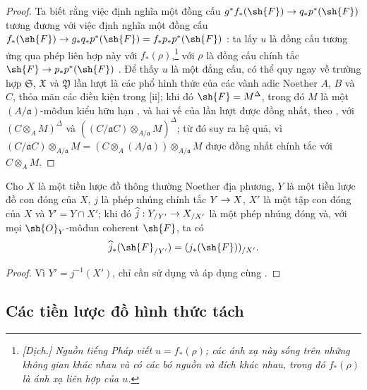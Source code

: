 \documentclass[oneside]{amsart}
\makeatletter
\newcommand{\ega@arrow}[2]{\mathchoice{#1}{#2}{#2}{#2}}
\renewcommand{\to}{\ega@arrow{\longrightarrow}{\rightarrow}}
\newcommand{\oldpage}[2][]{{\marginnote{\normalfont\textbf{#1}~|~#2}}\ignorespaces}
\let\EGAOriginalLabel\label
\renewcommand{\label}[1]{\phantomsection\EGAOriginalLabel{#1}}
\makeatother
\begin{document}
\begin{proof}
Ta biết rằng việc định nghĩa một đồng cấu $g^*f_*(\sh{F}) \to q_*p^*(\sh{F})$ tương đương với việc định nghĩa một đồng cấu $f_*(\sh{F}) \to g_*q_*p^*(\sh{F}) = f_*p_*p^*(\sh{F})$ :
ta lấy $u$ là đồng cấu tương ứng qua phép liên hợp này với $f_*(\rho)$,\footnote{\emph{[Dịch.] Nguồn tiếng Pháp viết $u=f_*(\rho)$; các ánh xạ này sống trên những không gian khác nhau và có các bó nguồn và đích khác nhau, trong đó $f_*(\rho)$ là ánh xạ liên hợp của $u$.}} với $\rho$ là đồng cấu chính tắc $\sh{F}\to p_*p^*(\sh{F})$ .
Để thấy $u$ là một đẳng cấu, có thể quy ngay về trường hợp $\mathfrak{S}$, $\mathfrak{X}$ và $\mathfrak{Y}$ lần lượt là các phổ hình thức của các vành adic Noether $A$, $B$ và $C$, thỏa mãn các điều kiện trong [ii];
khi đó $\sh{F}=M^\Delta$, trong đó $M$ là một $(A/\mathfrak{a})$-môđun kiểu hữu hạn , và hai vế của  lần lượt được đồng nhất, theo , với $(C\otimes_A M)^\Delta$ và $((C/\mathfrak{a}C)\otimes_{A/\mathfrak{a}}M)^\Delta$; từ đó suy ra hệ quả, vì $(C/\mathfrak{a}C)\otimes_{A/\mathfrak{a}}M = (C\otimes_A(A/\mathfrak{a}))\otimes_{A/\mathfrak{a}}M$ được đồng nhất chính tắc với $C\otimes_A M$.
\end{proof}

\oldpage[I]{212}
\begin{corollary}[10.14.7]
\label{I.10.14.7}
Cho $X$ là một tiền lược đồ thông thường Noether địa phương, $Y$ là một tiền lược đồ con đóng của $X$, $j$ là phép nhúng chính tắc $Y\to X$, $X'$ là một tập con đóng của $X$ và $Y'=Y\cap X'$;
khi đó $\widehat{j}:Y_{/Y'}\to X_{/X'}$ là một phép nhúng đóng và, với mọi $\sh{O}_Y$-môđun coherent $\sh{F}$, ta có
\[
    \widehat{j}_*(\sh{F}_{/Y'}) = (j_*(\sh{F}))_{/X'}.
\]
\end{corollary}

\begin{proof}
Vì $Y'=j^{-1}(X')$, chỉ cần sử dụng  và áp dụng  cùng .
\end{proof}

\subsection{Các tiền lược đồ hình thức tách}
\label{subsection:I.10.15}
\end{document}
